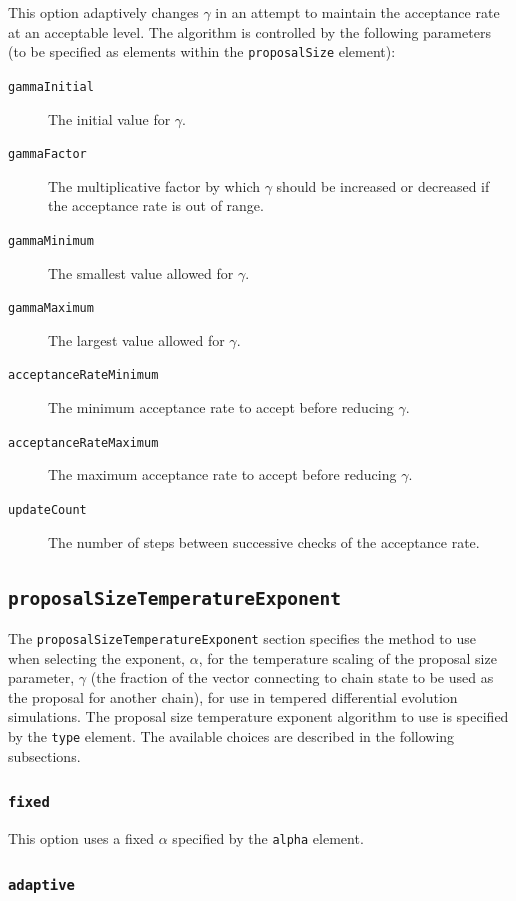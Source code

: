 This option adaptively changes $\gamma$ in an attempt to maintain the acceptance rate at an acceptable level. The algorithm is controlled by the following parameters (to be specified as elements within the {\tt proposalSize} element):
\begin{description}
\item[{\tt gammaInitial}] The initial value for $\gamma$.
\item[{\tt gammaFactor}] The multiplicative factor by which $\gamma$ should be increased or decreased if the acceptance rate is out of range.
\item[{\tt gammaMinimum}] The smallest value allowed for $\gamma$.
\item[{\tt gammaMaximum}] The largest value allowed for $\gamma$.
\item[{\tt acceptanceRateMinimum}] The minimum acceptance rate to accept before reducing $\gamma$.
\item[{\tt acceptanceRateMaximum}] The maximum acceptance rate to accept before reducing $\gamma$.
\item[{\tt updateCount}] The number of steps between successive checks of the acceptance rate.
\end{description}

\subsection{{\tt proposalSizeTemperatureExponent}}

The {\tt proposalSizeTemperatureExponent} section specifies the method to use when selecting the exponent, $\alpha$, for the temperature scaling of the proposal size parameter, $\gamma$ (the fraction of the vector connecting to chain state to be used as the proposal for another chain), for use in tempered differential evolution simulations. The proposal size temperature exponent algorithm to use is specified by the {\tt type} element. The available choices are described in the following subsections.

\subsubsection{{\tt fixed}}

This option uses a fixed $\alpha$ specified by the {\tt alpha} element.

\subsubsection{{\tt adaptive}}

